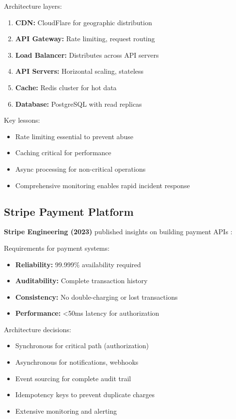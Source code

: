 \documentclass[conference]{IEEEtran}
\begin{document}
\begin{enumerate}
Architecture layers:
\begin{enumerate}
    \item \textbf{CDN:} CloudFlare for geographic distribution
    \item \textbf{API Gateway:} Rate limiting, request routing
    \item \textbf{Load Balancer:} Distributes across API servers
    \item \textbf{API Servers:} Horizontal scaling, stateless
    \item \textbf{Cache:} Redis cluster for hot data
    \item \textbf{Database:} PostgreSQL with read replicas
\end{enumerate}

Key lessons:
\begin{itemize}
    \item Rate limiting essential to prevent abuse
    \item Caching critical for performance
    \item Async processing for non-critical operations
    \item Comprehensive monitoring enables rapid incident response
\end{itemize}

\subsection{Stripe Payment Platform}

\textbf{Stripe Engineering (2023)} published insights on building payment APIs \cite{stripe2023}:

Requirements for payment systems:
\begin{itemize}
    \item \textbf{Reliability:} 99.999\% availability required
    \item \textbf{Auditability:} Complete transaction history
    \item \textbf{Consistency:} No double-charging or lost transactions
    \item \textbf{Performance:} <50ms latency for authorization
\end{itemize}

Architecture decisions:
\begin{itemize}
    \item Synchronous for critical path (authorization)
    \item Asynchronous for notifications, webhooks
    \item Event sourcing for complete audit trail
    \item Idempotency keys to prevent duplicate charges
    \item Extensive monitoring and alerting
\end{itemize}


\end{enumerate}
\end{document}
